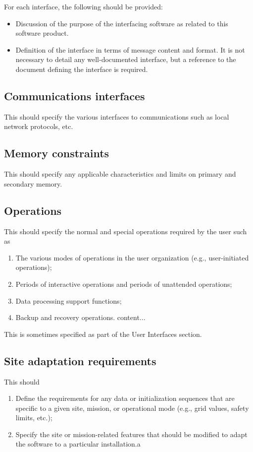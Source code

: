 \documentclass{scrreprt}
\begin{document}
For each interface, the following should be provided:
\begin{itemize}
	\item Discussion of the purpose of the interfacing software as related to
		this software product.
	\item Definition of the interface in terms of message content and format. It
		is not necessary to detail any well-documented interface, but a
		reference to the document defining the interface is required.
\end{itemize}

\subsection{Communications interfaces}
This should specify the various interfaces to communications such as local
network protocols, etc.

\subsection{Memory constraints}
This should specify any applicable characteristics and limits on primary and
secondary memory.

\subsection{Operations}
This should specify the normal and special operations required by the user such as
\begin{enumerate}
	\item The various modes of operations in the user organization (e.g.,
		user-initiated operations);
	\item Periods of interactive operations and periods of unattended operations;
	\item Data processing support functions;
	\item Backup and recovery operations.	content...
\end{enumerate}

This is sometimes specified as part of the User Interfaces section.

\subsection{Site adaptation requirements}
This should
\begin{enumerate}
	\item Define the requirements for any data or initialization sequences that
		are specific to a given site, mission, or operational mode (e.g., grid
		values, safety limits, etc.);
	\item Specify the site or mission-related features that should be modified
		to adapt the software to a particular installation.a
\end{enumerate}
\end{document}
